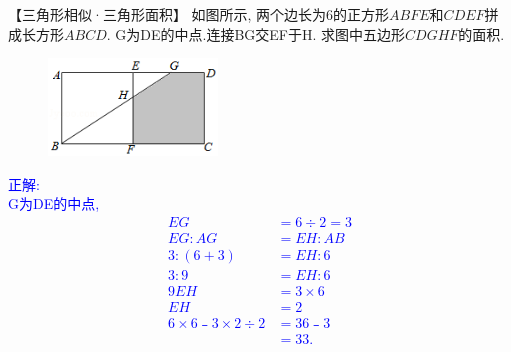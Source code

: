 \item {
    【三角形相似·三角形面积】
    如图所示, 两个边长为6的正方形$ABFE$和$CDEF$拼成长方形$ABCD$. G为DE的中点.连接BG交EF于H. 求图中五边形$CDGHF$的面积.
    \begin{figure}[H] 
        \centering
        \includegraphics[width=0.4\textwidth]{./pics/Chapter_2/13.png}
    \end{figure}
    \ifshowSolution 
        \fangsong{}\textcolor{blue}{
            正解: \\
            G为DE的中点,\\
            \begin{align*}
                EG&=6\div2=3 \\
                EG:AG&=EH:AB \\
                3:(6+3)&=EH:6 \\
                3:9&=EH:6 \\
                9EH&=3\times6 \\
                EH&=2 \\
                6\times6﹣3\times2\div2 &=36﹣3 \\
                &=33.
            \end{align*}
        }
    \else
        \vspace{1cm}
    \fi
}

